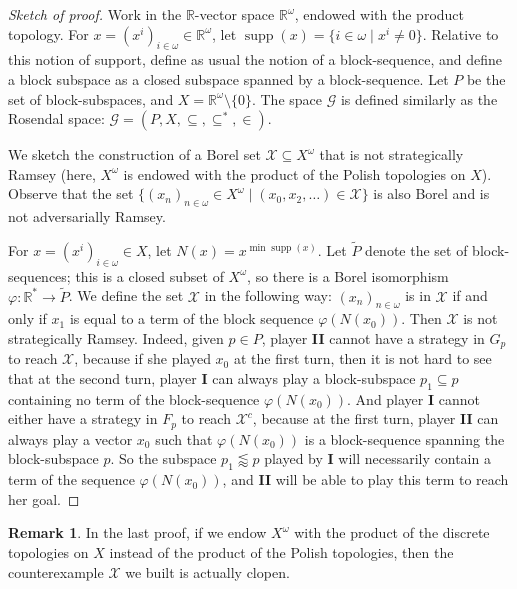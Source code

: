\documentclass[a4paper,11pt]{article}
\theoremstyle{definition}
\newtheorem{rem}[thm]{Remark}
\numberwithin{equation}{section}
\newcommand{\R}{\mathbb{R}}
\newcommand{\X}{\mathcal{X}}
\newcommand{\G}{\mathcal{G}}
\newcommand{\I}{\textbf{I}}
\newcommand{\II}{\textbf{II}}
\DeclareMathOperator{\supp}{supp}
\begin{document}
\begin{proof}[Sketch of proof]

Work in the $\R$-vector space $\R^\omega$, endowed with the product topology.  For $x = (x^i)_{i \in \omega}\in \R^\omega$, let $\supp(x) = \{i \in \omega \mid x^i \neq 0\}$. Relative to this notion of support, define as usual the notion of a block-sequence, and define a block subspace as a closed subspace spanned by a block-sequence. Let $P$ be the set of block-subspaces, and $X = \R^\omega \setminus \{0\}$. The space $\G$ is defined similarly as the Rosendal space: $\G = (P, X, \subseteq, \subseteq^*, \in)$.

\smallskip

We sketch the construction of a Borel set $\X \subseteq X^\omega$ that is not strategically Ramsey (here, $X^\omega$ is endowed with the product of the Polish topologies on $X$).  Observe that the set $\{(x_n)_{n \in \omega} \in X^\omega \mid (x_0, x_2, \ldots) \in \X\}$ is also Borel and is not adversarially Ramsey.

\smallskip

For $x = (x^i)_{i \in \omega}\in X$, let $N(x) = x^{\min \supp(x)}$. Let $\widetilde{P}$ denote the set of block-sequences; this is a closed subset of $X^\omega$, so there is a Borel isomorphism $\varphi : \R^* \longrightarrow \widetilde{P}$. We define the set $\X$ in the following way: $(x_n)_{n \in \omega}$ is in $\X$ if and only if $x_1$ is equal to a term of the block sequence $\varphi(N(x_0))$. Then $\X$ is not strategically Ramsey. Indeed, given $p \in P$, player \II{} cannot have a strategy in $G_p$ to reach $\X$, because if she played $x_0$ at the first turn, then it is not hard to see that at the second turn, player \I{} can always play a block-subspace $p_1 \subseteq p$ containing no term of the block-sequence $\varphi(N(x_0))$. And player \I{} cannot either have a strategy in $F_p$ to reach $\X^c$, because at the first turn, player \II{} can always play a vector $x_0$ such that $\varphi(N(x_0))$ is a block-sequence spanning the block-subspace $p$. So the subspace $p_1 \lessapprox p$ played by \I{} will necessarily contain a term of the sequence $\varphi(N(x_0))$, and \II{} will be able to play this term to reach her goal.

\end{proof}

\begin{rem}

In the last proof, if we endow $X^\omega$ with the product of the discrete topologies on $X$ instead of the product of the Polish topologies, then the counterexample $\X$ we built is actually clopen.

\end{rem}
\end{document}
